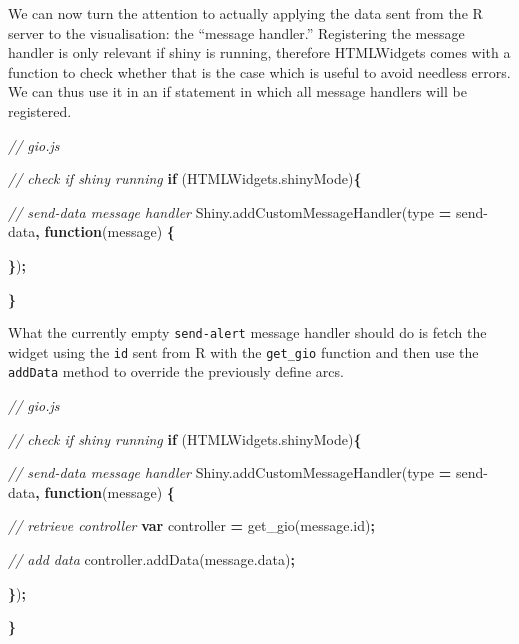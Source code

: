 \documentclass[
]{krantz}
\makeatletter
\newenvironment{Shaded}{\begin{snugshade}}{\end{snugshade}}
\newcommand{\AttributeTok}[1]{\textcolor[rgb]{0.61,0.61,0.61}{#1}}
\newcommand{\CommentTok}[1]{\textcolor[rgb]{0.37,0.37,0.37}{\textit{#1}}}
\newcommand{\ControlFlowTok}[1]{\textcolor[rgb]{0.27,0.27,0.27}{\textbf{#1}}}
\newcommand{\KeywordTok}[1]{\textcolor[rgb]{0.27,0.27,0.27}{\textbf{#1}}}
\newcommand{\NormalTok}[1]{#1}
\newcommand{\OperatorTok}[1]{\textcolor[rgb]{0.43,0.43,0.43}{\textbf{#1}}}
\newcommand{\StringTok}[1]{\textcolor[rgb]{0.5,0.5,0.5}{#1}}
\newcommand{\VariableTok}[1]{\textcolor[rgb]{0,0,0}{#1}}
\newenvironment{kframe}{%
\medskip{}
\setlength{\fboxsep}{.8em}
 \def\at@end@of@kframe{}%
 \ifinner\ifhmode%
  \def\at@end@of@kframe{\end{minipage}}%
  \begin{minipage}{\columnwidth}%
 \fi\fi%
 \def\FrameCommand##1{\hskip\@totalleftmargin \hskip-\fboxsep
 \colorbox{shadecolor}{##1}\hskip-\fboxsep
     \hskip-\linewidth \hskip-\@totalleftmargin \hskip\columnwidth}%
 \MakeFramed {\advance\hsize-\width
   \@totalleftmargin\z@ \linewidth\hsize
   \@setminipage}}%
 {\par\unskip\endMakeFramed%
 \at@end@of@kframe}
\renewenvironment{Shaded}{\begin{kframe}}{\end{kframe}}
\makeatother
\begin{document}
We can now turn the attention to actually applying the data sent from the R server to the visualisation: the ``message handler.'' Registering the message handler is only relevant if shiny is running, therefore HTMLWidgets comes with a function to check whether that is the case which is useful to avoid needless errors. We can thus use it in an if statement in which all message handlers will be registered.

\begin{Shaded}
\begin{Highlighting}[]
\CommentTok{// gio.js}

\CommentTok{// check if shiny running}
\ControlFlowTok{if}\NormalTok{ (}\VariableTok{HTMLWidgets}\NormalTok{.}\AttributeTok{shinyMode}\NormalTok{)}\OperatorTok{\{}

  \CommentTok{// send{-}data message handler}
  \VariableTok{Shiny}\NormalTok{.}\AttributeTok{addCustomMessageHandler}\NormalTok{(type }\OperatorTok{=} \StringTok{\textquotesingle{}send{-}data\textquotesingle{}}\OperatorTok{,} \KeywordTok{function}\NormalTok{(message) }\OperatorTok{\{}

  \OperatorTok{\}}\NormalTok{)}\OperatorTok{;}

\OperatorTok{\}}
\end{Highlighting}
\end{Shaded}

What the currently empty \texttt{send-alert} message handler should do is fetch the widget using the \texttt{id} sent from R with the \texttt{get\_gio} function and then use the \texttt{addData} method to override the previously define arcs.

\begin{Shaded}
\begin{Highlighting}[]
\CommentTok{// gio.js}

\CommentTok{// check if shiny running}
\ControlFlowTok{if}\NormalTok{ (}\VariableTok{HTMLWidgets}\NormalTok{.}\AttributeTok{shinyMode}\NormalTok{)}\OperatorTok{\{}

  \CommentTok{// send{-}data message handler}
  \VariableTok{Shiny}\NormalTok{.}\AttributeTok{addCustomMessageHandler}\NormalTok{(type }\OperatorTok{=} \StringTok{\textquotesingle{}send{-}data\textquotesingle{}}\OperatorTok{,} \KeywordTok{function}\NormalTok{(message) }\OperatorTok{\{}

    \CommentTok{// retrieve controller}
    \KeywordTok{var}\NormalTok{ controller }\OperatorTok{=} \AttributeTok{get\_gio}\NormalTok{(}\VariableTok{message}\NormalTok{.}\AttributeTok{id}\NormalTok{)}\OperatorTok{;}

    \CommentTok{// add data}
    \VariableTok{controller}\NormalTok{.}\AttributeTok{addData}\NormalTok{(}\VariableTok{message}\NormalTok{.}\AttributeTok{data}\NormalTok{)}\OperatorTok{;}

  \OperatorTok{\}}\NormalTok{)}\OperatorTok{;}

\OperatorTok{\}}
\end{Highlighting}
\end{Shaded}
\end{document}
